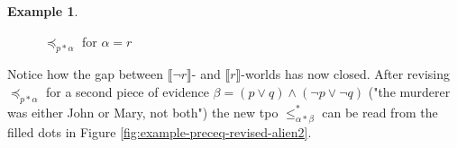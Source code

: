 \documentclass[english, 12pt]{scrartcl}
\theoremstyle{definition}
\newtheorem{example}{Example}
\theoremstyle{definition}
\theoremstyle{definition}
\newcommand{\modelsOf}[1]{\llbracket #1 \rrbracket}
\begin{document}
\begin{example}
\begin{figure}[H]
            \caption{$\preceq_{p \ast \alpha}$ for $\alpha = r$}
            \label{fig:example-preceq-revised-alien}
    \end{figure}
    
    Notice how the gap between $\modelsOf{\neg r}$- and $\modelsOf{r}$-worlds has now closed. After revising $\preceq_{p \ast \alpha}$ for a second piece of evidence $\beta = (p \vee q) \wedge (\neg p \vee \neg q)$ ("the murderer was either John or Mary, not both") the new tpo $\leq_{\alpha \ast \beta}^{\ast}$ can be read from the filled dots in Figure \ref{fig:example-preceq-revised-alien2}.
    

\end{example}
\end{document}
